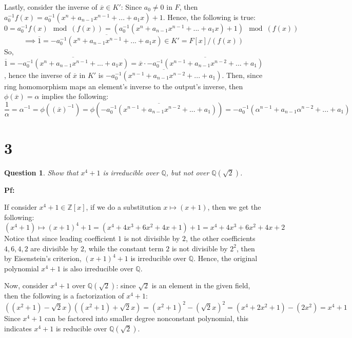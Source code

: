 \documentclass{article}
\newtheorem{question}{Question}
\begin{document}
\hfil

Lastly, consider the inverse of $\overline{x}\in K'$: Since $a_0\neq 0$ in $F$, then $a_0^{-1}f(x)=a_0^{-1}(x^n+a_{n-1}x^{n-1}+...+a_1x)+1$.
Hence, the following is true:
$$0=a_0^{-1}f(x)\mod (f(x)) = (a_0^{-1}(x^n+a_{n-1}x^{n-1}+...+a_1x)+1)\mod (f(x))$$
$$\implies \overline{1}=\overline{-a_0^{-1}(x^n+a_{n-1}x^{n-1}+...+a_1x)}\in K' = F[x]/(f(x))$$
So, $\overline{1}=\overline{-a_0^{-1}(x^n+a_{n-1}x^{n-1}+...+a_1x)}=\overline{x}\cdot \overline{-a_0^{-1}(x^{n-1}+a_{n-1}x^{n-2}+...+a_1)}$, hence the inverse of $\overline{x}$ in $K'$ is $\overline{-a_0^{-1}(x^{n-1}+a_{n-1}x^{n-2}+...+a_1)}$.
Then, since ring homomorphism maps an element's inverse to the output's inverse, then $\phi(\overline{x})=\alpha$ implies the following: 
$$\frac{1}{\alpha}=\alpha^{-1}=\phi((\overline{x})^{-1})=\phi\left(\overline{-a_0^{-1}(x^{n-1}+a_{n-1}x^{n-2}+...+a_1)}\right)=-a_0^{-1}(\alpha^{n-1}+a_{n-1}\alpha^{n-2}+...+a_1)$$


\break

\section*{3}
\begin{myBox}[]{}
    \begin{question}
        Show that $x^4+1$ is irreducible over $\mathbb{Q}$, but not over $\mathbb{Q}(\sqrt{2})$.
    \end{question}
\end{myBox}

\textbf{Pf:}

If consider $x^4+1\in \mathbb{Z}[x]$, if we do a substitution $x\mapsto (x+1)$, then we get the following:
$$(x^4+1)\mapsto (x+1)^4+1 =(x^4+4x^3+6x^2+4x+1)+1 = x^4+4x^3+6x^2+4x+2$$
Notice that since leading coefficient $1$ is not divisible by $2$, the other coefficients $4,6,4,2$ are divisible by $2$,
while the constant term $2$ is not divisible by $2^2$, then by Eisenstein's criterion, $(x+1)^4+1$ is irreducible over $\mathbb{Q}$.
Hence, the original polynomial $x^4+1$ is also irreducible over $\mathbb{Q}$.

\hfil

Now, consider $x^4+1$ over $\mathbb{Q}(\sqrt{2})$: since $\sqrt{2}$ is an element in the given field, then the following is a factorization of $x^4+1$:
$$((x^2+1)-\sqrt{2}x)((x^2+1)+\sqrt{2}x)=(x^2+1)^2-(\sqrt{2}x)^2=(x^4+2x^2+1)-(2x^2)=x^4+1$$
Since $x^4+1$ can be factored into smaller degree nonconstant polynomial, this indicates $x^4+1$ is reducible over $\mathbb{Q}(\sqrt{2})$.
\end{document}
